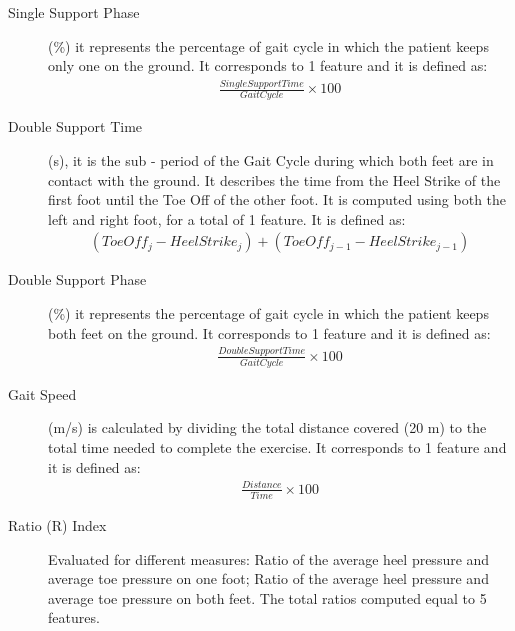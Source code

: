 \begin{description}
\item[Single Support Phase] (\%) it represents the percentage of gait cycle in which the patient keeps only one on the ground.  It corresponds to 1 feature and it is defined as:
\begin{equation}
\begin{aligned}
\frac{Single Support Time}{Gait Cycle} \times 100
\end{aligned}
\end{equation}


\item[Double Support Time] 
(s), it is the sub - period of the Gait Cycle during which both feet are in contact
with the ground. It describes the time from the Heel Strike of the first foot until the Toe Off of the other foot. It is computed using both the left and right foot, for a total of 1 feature. It is defined as:
\begin{equation}
\begin{aligned}
(Toe Off_j - Heel Strike_j) + (Toe Off_{j-1} - Heel Strike_{j-1})
\end{aligned}
\end{equation}

\item[Double Support Phase] (\%) it represents the percentage of gait cycle in which the patient keeps both feet on the ground. It corresponds to 1 feature and it is defined as:
\begin{equation}
\begin{aligned}
\frac{Double Support Time}{Gait Cycle} \times 100
\end{aligned}
\end{equation}


\item[Gait Speed] 
(m/s) is calculated by dividing the total distance covered (20 m) to the total time needed to complete the exercise.  It corresponds to 1 feature and it is defined as:
\begin{equation}
\begin{aligned}
\frac{Distance}{Time} \times 100
\end{aligned}
\end{equation}


\item[Ratio (R) Index] Evaluated for different measures: Ratio of the average heel pressure and average toe pressure on one foot; Ratio of the average heel pressure and average toe pressure on both feet. The total ratios computed equal to 5 features.


\end{description}
